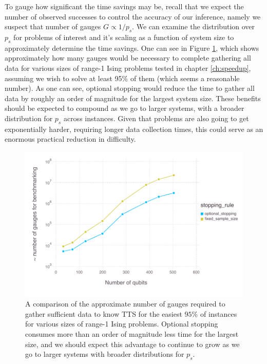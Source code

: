 To gauge how significant the time savings may be, recall that we expect the number of observed successes to control the accuracy of our inference, namely we suspect that number of gauges $G \propto 1/p_s$. We can examine the distribution over $p_s$ for problems of interest and it's scaling as a function of system size to approximately determine the time savings. One can see in Figure \ref{fig:optstop}, which shows approximately how many gauges would be necessary to complete gathering all data for various sizes of range-1 Ising problems tested in chapter \ref{ch:speedup}, assuming we wish to solve at least 95$\%$ of them (which seems a reasonable number). As one can see, optional stopping would reduce the time to gather all data by roughly an order of magnitude for the largest system size. These benefits should be expected to compound as we go to larger systems, with a broader distribution for $p_s$ across instances. Given that problems are also going to get exponentially harder, requiring longer data collection times, this could serve as an enormous practical reduction in difficulty.

\begin{figure}[hbt]
  \includegraphics[scale=0.66]{chapters/Benchmarking/optionalstoppingsavings}
  \caption{A comparison of the approximate number of gauges required to gather sufficient data to know TTS for the easiest $95\%$ of instances for various sizes of range-1 Ising problems. Optional stopping consumes more than an order of magnitude less time for the largest size, and we should expect this advantage to continue to grow as we go to larger systems with broader distributions for $p_s$.}
  \label{fig:optstop}
\end{figure}

